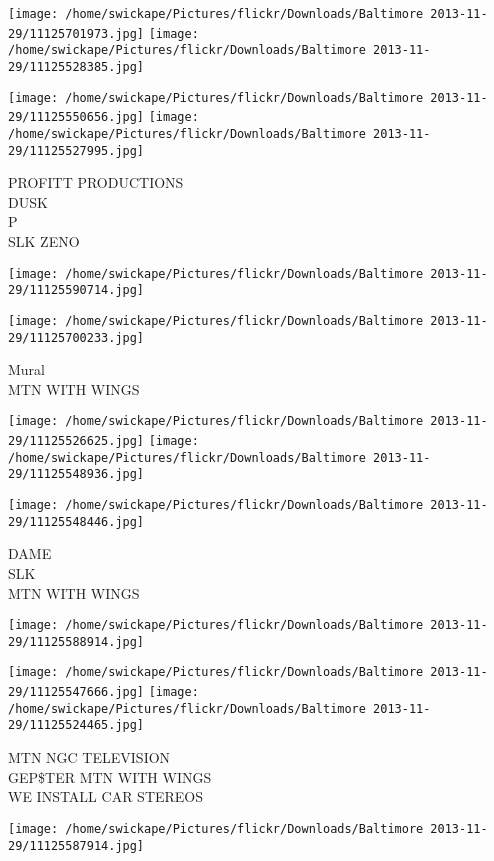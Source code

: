 \documentclass[10pt,letterpaper]{article}
\begin{document}
\texttt{[image: /home/swickape/Pictures/flickr/Downloads/Baltimore 2013-11-29/11125701973.jpg]}
\texttt{[image: /home/swickape/Pictures/flickr/Downloads/Baltimore 2013-11-29/11125528385.jpg]}

\texttt{[image: /home/swickape/Pictures/flickr/Downloads/Baltimore 2013-11-29/11125550656.jpg]}
\texttt{[image: /home/swickape/Pictures/flickr/Downloads/Baltimore 2013-11-29/11125527995.jpg]}

PROFITT PRODUCTIONS\\
DUSK\\
P\\
SLK ZENO
\pagebreak

\texttt{[image: /home/swickape/Pictures/flickr/Downloads/Baltimore 2013-11-29/11125590714.jpg]}

\vspace{0.25in}
\texttt{[image: /home/swickape/Pictures/flickr/Downloads/Baltimore 2013-11-29/11125700233.jpg]}

Mural\\
MTN WITH WINGS
\pagebreak

\texttt{[image: /home/swickape/Pictures/flickr/Downloads/Baltimore 2013-11-29/11125526625.jpg]}
\texttt{[image: /home/swickape/Pictures/flickr/Downloads/Baltimore 2013-11-29/11125548936.jpg]}

\texttt{[image: /home/swickape/Pictures/flickr/Downloads/Baltimore 2013-11-29/11125548446.jpg]}

DAME\\
SLK\\
MTN WITH WINGS
\pagebreak

\texttt{[image: /home/swickape/Pictures/flickr/Downloads/Baltimore 2013-11-29/11125588914.jpg]}

\vspace{0.25in}
\texttt{[image: /home/swickape/Pictures/flickr/Downloads/Baltimore 2013-11-29/11125547666.jpg]}
\texttt{[image: /home/swickape/Pictures/flickr/Downloads/Baltimore 2013-11-29/11125524465.jpg]}

MTN NGC TELEVISION\\
GEP\$TER MTN WITH WINGS\\
WE INSTALL CAR STEREOS
\pagebreak

\texttt{[image: /home/swickape/Pictures/flickr/Downloads/Baltimore 2013-11-29/11125587914.jpg]}
\end{document}
